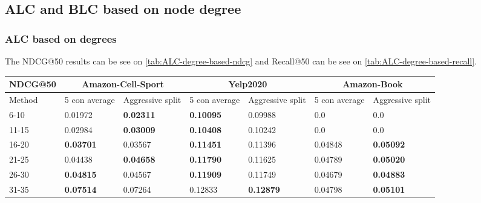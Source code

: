 \subsection{ALC and BLC based on node degree }\label{app:adjusted-layer-combi}


\subsubsection{ALC based on degrees}
The NDCG@50 results can be see on \autoref{tab:ALC-degree-based-ndcg} and Recall@50 can be see on \autoref{tab:ALC-degree-based-recall}.

\begin{table*}[h!]
    \centering
    \begin{tabular}{|l|l|l||l|l||l|l|}
        \hline
        NDCG@50  & \multicolumn{2}{c||}{Amazon-Cell-Sport} & \multicolumn{2}{c||}{Yelp2020} & \multicolumn{2}{c|}{Amazon-Book}                                                          \\ \hline
        Method   & 5 con average                           & Aggressive split               & 5 con average                    & Aggressive split & 5 con average    & Aggressive split \\ \hline
        6-10     & 0.01972                                 & \textbf{0.02311}               & \textbf{0.10095}                 & 0.09988          & 0.0              & 0.0              \\ \hline
        11-15    & 0.02984                                 & \textbf{0.03009}               & \textbf{0.10408}                 & 0.10242          & 0.0              & 0.0              \\ \hline
        16-20    & \textbf{0.03701}                        & 0.03567                        & \textbf{0.11451}                 & 0.11396          & 0.04848          & \textbf{0.05092} \\ \hline
        21-25    & 0.04438                                 & \textbf{0.04658}               & \textbf{0.11790}                 & 0.11625          & 0.04789          & \textbf{0.05020} \\ \hline
        26-30    & \textbf{0.04815}                        & 0.04567                        & \textbf{0.11909}                 & 0.11749          & 0.04679          & \textbf{0.04883} \\ \hline
        31-35    & \textbf{0.07514}                        & 0.07264                        & 0.12833                          & \textbf{0.12879} & 0.04798          & \textbf{0.05101} \\ \hline

\end{tabular}
\end{table*}
